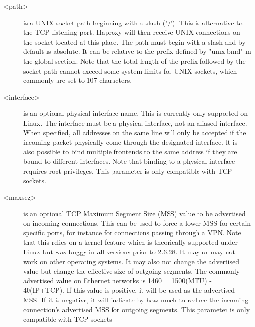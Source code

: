 \begin{description}
  \item[<path>]        is a UNIX socket path beginning with a slash ('/'). This is
                  alternative to the TCP listening port. Haproxy will then
                  receive UNIX connections on the socket located at this place.
                  The path must begin with a slash and by default is absolute.
                  It can be relative to the prefix defined by "unix-bind" in
                  the global section. Note that the total length of the prefix
                  followed by the socket path cannot exceed some system limits
                  for UNIX sockets, which commonly are set to 107 characters.

  \item[<interface>]   is an optional physical interface name. This is currently
                  only supported on Linux. The interface must be a physical
                  interface, not an aliased interface. When specified, all
                  addresses on the same line will only be accepted if the
                  incoming packet physically come through the designated
                  interface. It is also possible to bind multiple frontends to
                  the same address if they are bound to different interfaces.
                  Note that binding to a physical interface requires root
                  privileges. This parameter is only compatible with TCP
                  sockets.

  \item[<maxseg>]      is an optional TCP Maximum Segment Size (MSS) value to be
                  advertised on incoming connections. This can be used to force
                  a lower MSS for certain specific ports, for instance for
                  connections passing through a VPN. Note that this relies on a
                  kernel feature which is theorically supported under Linux but
                  was buggy in all versions prior to 2.6.28. It may or may not
                  work on other operating systems. It may also not change the
                  advertised value but change the effective size of outgoing
                  segments. The commonly advertised value on Ethernet networks
                  is 1460 = 1500(MTU) - 40(IP+TCP). If this value is positive,
                  it will be used as the advertised MSS. If it is negative, it
                  will indicate by how much to reduce the incoming connection's
                  advertised MSS for outgoing segments. This parameter is only
                  compatible with TCP sockets.


\end{description}
